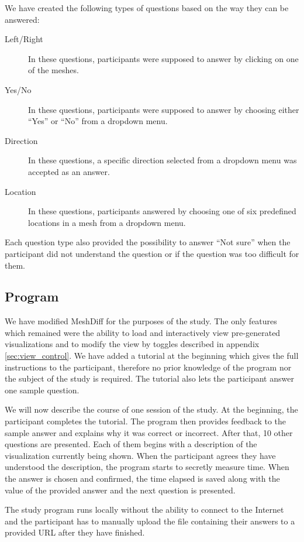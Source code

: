 We have created the following types of questions based on the way they can be answered:

\begin{description}
\item [Left/Right] In these questions, participants were supposed to answer by clicking on one of the meshes.
\item [Yes/No] In these questions, participants were supposed to answer by choosing either ``Yes'' or ``No'' from a dropdown menu.
\item [Direction] In these questions, a specific direction selected from a dropdown menu was accepted as an answer.
\item [Location] In these questions, participants answered by choosing one of six predefined locations in a mesh from a dropdown menu.
\end{description}

Each question type also provided the possibility to answer ``Not sure'' when the participant did not understand the question or if the question was too difficult for them.

\subsection{Program}

We have modified MeshDiff for the purposes of the study. The only features which remained were the ability to load and interactively view pre-generated visualizations and to modify the view by toggles described in appendix \ref{sec:view_control}. We have added a tutorial at the beginning which gives the full instructions to the participant, therefore no prior knowledge of the program nor the subject of the study is required. The tutorial also lets the participant answer one sample question. 

We will now describe the course of one session of the study. At the beginning, the participant completes the tutorial. The program then provides feedback to the sample answer and explains why it was correct or incorrect. After that, 10 other questions are presented. Each of them begins with a description of the visualization currently being shown. When the participant agrees they have understood the description, the program starts to secretly measure time. When the answer is chosen and confirmed, the time elapsed is saved along with the value of the provided answer and the next question is presented.

The study program runs locally without the ability to connect to the Internet and the participant has to manually upload the file containing their answers to a provided URL after they have finished.

